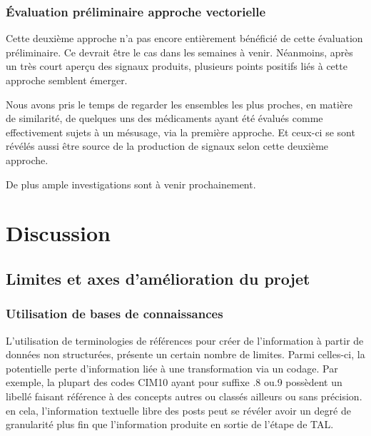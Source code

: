 \documentclass[a4paper, 12pt, openany, oneside, abstract=on]{article} %
\begin{document}
\subsubsection{Évaluation préliminaire approche vectorielle}
Cette deuxième approche n'a pas encore entièrement bénéficié de cette évaluation préliminaire. Ce devrait être le cas dans les semaines à venir. Néanmoins, après un très court aperçu des signaux produits, plusieurs points positifs liés à cette approche semblent émerger.

Nous avons pris le temps de regarder les ensembles les plus proches, en matière de similarité, de quelques uns des médicaments ayant été évalués comme effectivement sujets à un mésusage, via la première approche. Et ceux-ci se sont révélés aussi être source de la production de signaux selon cette deuxième approche.

De plus ample investigations sont à venir prochainement.

\section{Discussion}

\subsection{Limites et axes d'amélioration du projet}
\label{limites}

\subsubsection{Utilisation de bases de connaissances}
L'utilisation de terminologies de références pour créer de l'information à partir de données non structurées, présente un certain nombre de limites. Parmi celles-ci, la potentielle perte d'information liée à une transformation via un codage\cite{Stausberg2008}.
Par exemple, la plupart des codes CIM10 ayant pour suffixe \og{}.8\fg{} ou\og{}.9\fg{} possèdent un libellé faisant référence à des concepts \og{}autres\fg{} ou \og{}classés ailleurs\fg{} ou \og{}sans précision\fg{}. en cela, l'information textuelle libre des posts peut se révéler avoir un degré de granularité plus fin que l'information produite en sortie de l'étape de TAL.
\end{document}
